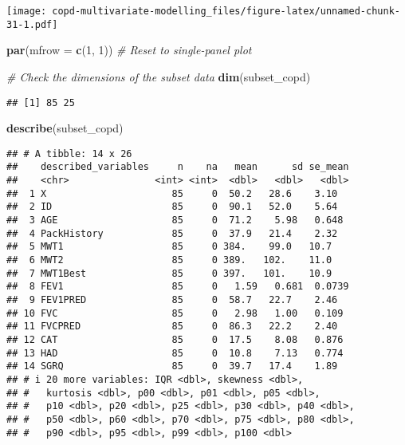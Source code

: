 \documentclass[
]{article}
\newenvironment{Shaded}{\begin{snugshade}}{\end{snugshade}}
\newcommand{\AttributeTok}[1]{\textcolor[rgb]{0.13,0.29,0.53}{#1}}
\newcommand{\CommentTok}[1]{\textcolor[rgb]{0.56,0.35,0.01}{\textit{#1}}}
\newcommand{\DecValTok}[1]{\textcolor[rgb]{0.00,0.00,0.81}{#1}}
\newcommand{\FunctionTok}[1]{\textcolor[rgb]{0.13,0.29,0.53}{\textbf{#1}}}
\newcommand{\NormalTok}[1]{#1}
\begin{document}
\texttt{[image: copd-multivariate-modelling\_files/figure-latex/unnamed-chunk-31-1.pdf]}

\begin{Shaded}
\begin{Highlighting}[]
\FunctionTok{par}\NormalTok{(}\AttributeTok{mfrow =} \FunctionTok{c}\NormalTok{(}\DecValTok{1}\NormalTok{, }\DecValTok{1}\NormalTok{))  }\CommentTok{\# Reset to single{-}panel plot}
\end{Highlighting}
\end{Shaded}

\begin{Shaded}
\begin{Highlighting}[]
\CommentTok{\# Check the dimensions of the subset data}
\FunctionTok{dim}\NormalTok{(subset\_copd)}
\end{Highlighting}
\end{Shaded}

\begin{verbatim}
## [1] 85 25
\end{verbatim}

\begin{Shaded}
\begin{Highlighting}[]
\FunctionTok{describe}\NormalTok{(subset\_copd)}
\end{Highlighting}
\end{Shaded}

\begin{verbatim}
## # A tibble: 14 x 26
##    described_variables     n    na   mean      sd se_mean
##    <chr>               <int> <int>  <dbl>   <dbl>   <dbl>
##  1 X                      85     0  50.2   28.6    3.10  
##  2 ID                     85     0  90.1   52.0    5.64  
##  3 AGE                    85     0  71.2    5.98   0.648 
##  4 PackHistory            85     0  37.9   21.4    2.32  
##  5 MWT1                   85     0 384.    99.0   10.7   
##  6 MWT2                   85     0 389.   102.    11.0   
##  7 MWT1Best               85     0 397.   101.    10.9   
##  8 FEV1                   85     0   1.59   0.681  0.0739
##  9 FEV1PRED               85     0  58.7   22.7    2.46  
## 10 FVC                    85     0   2.98   1.00   0.109 
## 11 FVCPRED                85     0  86.3   22.2    2.40  
## 12 CAT                    85     0  17.5    8.08   0.876 
## 13 HAD                    85     0  10.8    7.13   0.774 
## 14 SGRQ                   85     0  39.7   17.4    1.89  
## # i 20 more variables: IQR <dbl>, skewness <dbl>,
## #   kurtosis <dbl>, p00 <dbl>, p01 <dbl>, p05 <dbl>,
## #   p10 <dbl>, p20 <dbl>, p25 <dbl>, p30 <dbl>, p40 <dbl>,
## #   p50 <dbl>, p60 <dbl>, p70 <dbl>, p75 <dbl>, p80 <dbl>,
## #   p90 <dbl>, p95 <dbl>, p99 <dbl>, p100 <dbl>
\end{verbatim}
\end{document}
